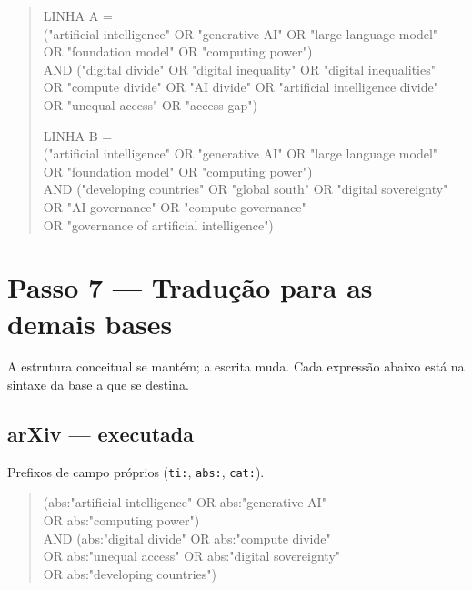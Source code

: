 \documentclass[12pt,a4paper]{article}
\begin{document}
\begin{quote}\footnotesize\ttfamily
LINHA A =\\
("artificial intelligence" OR "generative AI" OR "large language model"\\
 OR "foundation model" OR "computing power")\\
AND ("digital divide" OR "digital inequality" OR "digital inequalities"\\
 OR "compute divide" OR "AI divide" OR "artificial intelligence divide"\\
 OR "unequal access" OR "access gap")

\vspace{0.6em}
LINHA B =\\
("artificial intelligence" OR "generative AI" OR "large language model"\\
 OR "foundation model" OR "computing power")\\
AND ("developing countries" OR "global south" OR "digital sovereignty"\\
 OR "AI governance" OR "compute governance"\\
 OR "governance of artificial intelligence")
\end{quote}

\section{Passo 7 --- Tradução para as demais bases}
\label{sec:traducao}

A estrutura conceitual se mantém; a escrita muda. Cada expressão abaixo está na sintaxe da
base a que se destina.

\subsection{arXiv --- executada}

Prefixos de campo próprios (\texttt{ti:}, \texttt{abs:}, \texttt{cat:}).

\begin{quote}\scriptsize\ttfamily
(abs:"artificial intelligence" OR abs:"generative AI"\\
 OR abs:"computing power")\\
AND (abs:"digital divide" OR abs:"compute divide"\\
 OR abs:"unequal access" OR abs:"digital sovereignty"\\
 OR abs:"developing countries")
\end{quote}
\end{document}
